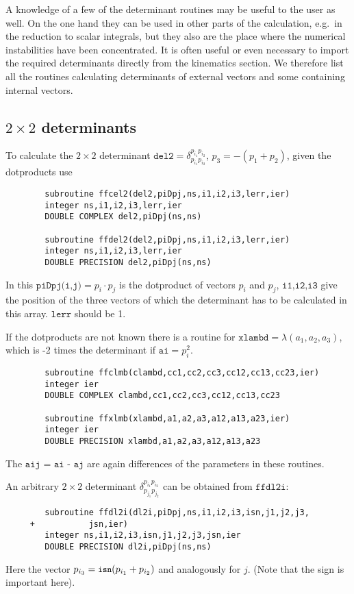 \documentclass[twoside,12pt]{report}
\def\Code#1{\ensuremath{\texttt{#1}}}
\begin{document}
\begin{appendix}
A knowledge of a few of the determinant routines may be useful to the user as 
well.   On the one hand they can be used in other parts of the calculation, 
e.g.\ in the reduction to scalar integrals, but they also are the place where 
the numerical instabilities have been concentrated.  It is often useful or 
even necessary to import the required determinants directly from the 
kinematics section.  We therefore list all the routines calculating 
determinants of external vectors and some containing internal vectors.


\subsection{$2\times2$ determinants}

To calculate the $2\times2$ determinant $\Code{del2} = 
\delta^{p_{i_1}p_{i_2}}_{p_{i_1}p_{i_2}}$, $p_3 = -(p_1+p_2)$, given the 
dotproducts use
\begin{verbatim}
        subroutine ffcel2(del2,piDpj,ns,i1,i2,i3,lerr,ier)
        integer ns,i1,i2,i3,lerr,ier
        DOUBLE COMPLEX del2,piDpj(ns,ns)

        subroutine ffdel2(del2,piDpj,ns,i1,i2,i3,lerr,ier)
        integer ns,i1,i2,i3,lerr,ier
        DOUBLE PRECISION del2,piDpj(ns,ns)
\end{verbatim}
In this $\Code{piDpj(i,j)} = p_i \cdot p_j$ is the dotproduct of vectors 
$p_i$ and $p_j$, \Code{i1,i2,i3} give the position of the three vectors of 
which the determinant has to be calculated in this array.  \Code{lerr} should 
be 1.

If the dotproducts are not known there is a routine for $\Code{xlambd} =
\lambda(a_1,a_2,a_3)$, which is -2 times the determinant if 
$\Code{ai} = p_i^2$.
\begin{verbatim}
        subroutine ffclmb(clambd,cc1,cc2,cc3,cc12,cc13,cc23,ier)
        integer ier
        DOUBLE COMPLEX clambd,cc1,cc2,cc3,cc12,cc13,cc23

        subroutine ffxlmb(xlambd,a1,a2,a3,a12,a13,a23,ier)
        integer ier
        DOUBLE PRECISION xlambd,a1,a2,a3,a12,a13,a23
\end{verbatim}
The \Code{aij = ai - aj} are again differences of the parameters in these 
routines.

An arbitrary $2\times2$ determinant $\delta^{p_{i_1} p_{i_2}}_{p_{j_1} 
p_{j_2}}$ can be obtained from \Code{ffdl2i}:
\begin{verbatim}
        subroutine ffdl2i(dl2i,piDpj,ns,i1,i2,i3,isn,j1,j2,j3,
     +           jsn,ier)
        integer ns,i1,i2,i3,isn,j1,j2,j3,jsn,ier
        DOUBLE PRECISION dl2i,piDpj(ns,ns)
\end{verbatim}
Here the vector $p_{i_3} = \mbox{\small\tt isn}(p_{i_1} + p_{i_2})$ and 
analogously for $j$.  (Note that the sign is important here).


\end{appendix}
\end{document}
